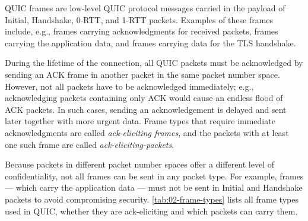 QUIC frames are low-level QUIC protocol messages carried in the payload of Initial, Handshake,
0-RTT, and 1-RTT packets. Examples of these frames include, e.g., \ACK{} frames carrying
acknowledgments for received packets, \STREAM{} frames carrying the application data, and \CRYPTO{}
frames carrying data for the TLS handshake.

During the lifetime of the connection, all QUIC packets must be acknowledged by sending an ACK frame
in another packet in the same packet number space. However, not all packets have to be acknowledged
immediately; e.g., acknowledging packets containing only ACK would cause an endless flood of ACK
packets. In such cases, sending an acknowledgement is delayed and sent later together with more
urgent data. Frame types that require immediate acknowledgments are called \textit{ack-eliciting
  frames}, and the packets with at least one such frame are called
\textit{\glspl{ack-eliciting-packet}}.

Because packets in different packet number spaces offer a different level of confidentiality, not
all frames can be sent in any packet type. For example, \STREAM{} frames --- which carry the
application data --- must not be sent in Initial and Handshake packets to avoid compromising
security. \autoref{tab:02-frame-types} lists all frame types used in QUIC, whether they are
ack-eliciting and which packets can carry them.

